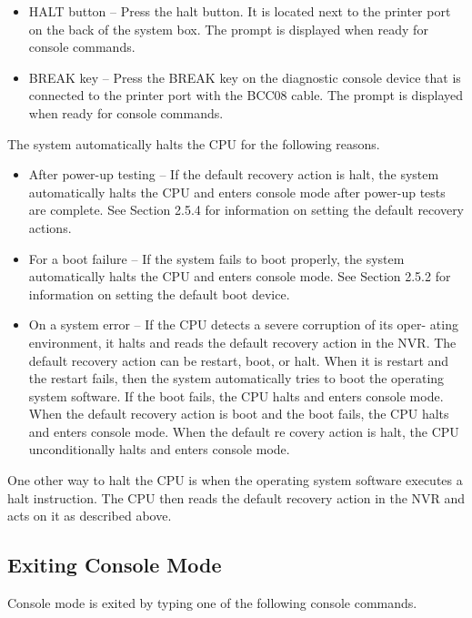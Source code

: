 \begin{itemize}
\item HALT button -- Press the halt button. It is located next to the printer port
on the back of the system box. The \console prompt is displayed when
ready for console commands.
\item BREAK key -- Press the BREAK key on the diagnostic console device
that is connected to the printer port with the BCC08 cable. The \console
prompt is displayed when ready for console commands.
\end{itemize}
The system automatically halts the CPU for the following reasons.
\begin{itemize}
\item After power-up testing -- If the default recovery action is halt, the system
automatically halts the CPU and enters console mode after power-up
tests are complete. See Section 2.5.4 for information on setting the
default recovery actions.
\item For a boot failure -- If the system fails to boot properly, the system 
automatically halts the CPU and enters console mode. See Section 2.5.2
for information on setting the default boot device.
\item On a system error -- If the CPU detects a severe corruption of its oper-
ating environment, it halts and reads the default recovery action in the
NVR. The default recovery action can be restart, boot, or halt. When
it is restart and the restart fails, then the system automatically tries to
boot the operating system software. If the boot fails, the CPU halts and
enters console mode. When the default recovery action is boot and the
boot fails, the CPU halts and enters console mode. When the default re
covery action is halt, the CPU unconditionally halts and enters console
mode.
\end{itemize}

One other way to halt the CPU is when the operating system software 
executes a halt instruction. The CPU then reads the default recovery action in
the NVR and acts on it as described above.

\subsection{Exiting Console Mode}

Console mode is exited by typing one of the following console commands.

